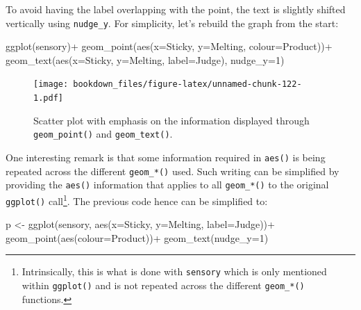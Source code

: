 \documentclass[
]{krantz}
\makeatletter
\newenvironment{Shaded}{\begin{snugshade}}{\end{snugshade}}
\newcommand{\AttributeTok}[1]{\textcolor[rgb]{0.61,0.61,0.61}{#1}}
\newcommand{\DecValTok}[1]{\textcolor[rgb]{0.06,0.06,0.06}{#1}}
\newcommand{\FunctionTok}[1]{\textcolor[rgb]{0,0,0}{#1}}
\newcommand{\NormalTok}[1]{#1}
\newcommand{\OtherTok}[1]{\textcolor[rgb]{0.37,0.37,0.37}{#1}}
\newcommand{\SpecialCharTok}[1]{\textcolor[rgb]{0,0,0}{#1}}
\newenvironment{kframe}{%
\medskip{}
\setlength{\fboxsep}{.8em}
 \def\at@end@of@kframe{}%
 \ifinner\ifhmode%
  \def\at@end@of@kframe{\end{minipage}}%
  \begin{minipage}{\columnwidth}%
 \fi\fi%
 \def\FrameCommand##1{\hskip\@totalleftmargin \hskip-\fboxsep
 \colorbox{shadecolor}{##1}\hskip-\fboxsep
     \hskip-\linewidth \hskip-\@totalleftmargin \hskip\columnwidth}%
 \MakeFramed {\advance\hsize-\width
   \@totalleftmargin\z@ \linewidth\hsize
   \@setminipage}}%
 {\par\unskip\endMakeFramed%
 \at@end@of@kframe}
\renewenvironment{Shaded}{\begin{kframe}}{\end{kframe}}
\makeatother
\begin{document}
To avoid having the label overlapping with the point, the text is slightly shifted vertically using \texttt{nudge\_y}. For simplicity, let's rebuild the graph from the start:

\begin{Shaded}
\begin{Highlighting}[]
\FunctionTok{ggplot}\NormalTok{(sensory)}\SpecialCharTok{+}
  \FunctionTok{geom\_point}\NormalTok{(}\FunctionTok{aes}\NormalTok{(}\AttributeTok{x=}\NormalTok{Sticky, }\AttributeTok{y=}\NormalTok{Melting, }\AttributeTok{colour=}\NormalTok{Product))}\SpecialCharTok{+}
  \FunctionTok{geom\_text}\NormalTok{(}\FunctionTok{aes}\NormalTok{(}\AttributeTok{x=}\NormalTok{Sticky, }\AttributeTok{y=}\NormalTok{Melting, }\AttributeTok{label=}\NormalTok{Judge), }\AttributeTok{nudge\_y=}\DecValTok{1}\NormalTok{)}
\end{Highlighting}
\end{Shaded}

\begin{figure}
\centering
\texttt{[image: bookdown\_files/figure-latex/unnamed-chunk-122-1.pdf]}
\caption{\label{fig:unnamed-chunk-122}Scatter plot with emphasis on the information displayed through \texttt{geom\_point()} and \texttt{geom\_text()}.}
\end{figure}

One interesting remark is that some information required in \texttt{aes()} is being repeated across the different \texttt{geom\_*()} used. Such writing can be simplified by providing the \texttt{aes()} information that applies to all \texttt{geom\_*()} to the original \texttt{ggplot()} call\footnote{Intrinsically, this is what is done with \texttt{sensory} which is only mentioned within \texttt{ggplot()} and is not repeated across the different \texttt{geom\_*()} functions.}. The previous code hence can be simplified to:

\begin{Shaded}
\begin{Highlighting}[]
\NormalTok{p }\OtherTok{\textless{}{-}} \FunctionTok{ggplot}\NormalTok{(sensory, }\FunctionTok{aes}\NormalTok{(}\AttributeTok{x=}\NormalTok{Sticky, }\AttributeTok{y=}\NormalTok{Melting, }\AttributeTok{label=}\NormalTok{Judge))}\SpecialCharTok{+}
  \FunctionTok{geom\_point}\NormalTok{(}\FunctionTok{aes}\NormalTok{(}\AttributeTok{colour=}\NormalTok{Product))}\SpecialCharTok{+}
  \FunctionTok{geom\_text}\NormalTok{(}\AttributeTok{nudge\_y=}\DecValTok{1}\NormalTok{)}
\end{Highlighting}
\end{Shaded}
\end{document}
